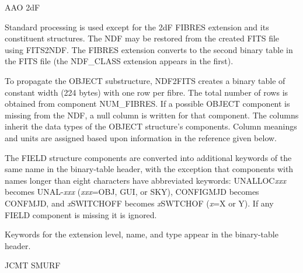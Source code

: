 \documentclass[twoside,11pt]{article}
\newcommand{\htmladdnormallink}[2]{#1}
\newcommand{\sstitem}{\item}
\newcommand{\sstitem}{\item}
\begin{document}
{{{         \sstitem
         AAO \htmladdnormallink{2dF}{http://www.aao.gov.au/local/www/2df/}

         Standard processing is used except for the 2dF FIBRES extension
         and its constituent structures.  The NDF may be restored from the
         created FITS file using FITS2NDF.  The FIBRES extension converts
         to the second binary table in the FITS file (the NDF\_CLASS
         extension appears in the first).

         To propagate the OBJECT substructure, NDF2FITS creates a binary
         table of constant width (224 bytes) with one row per fibre.  The
         total number of rows is obtained from component NUM\_FIBRES.  If a
         possible OBJECT component is missing from the NDF, a null column
         is written for that component.  The columns inherit the data
         types of the OBJECT structure's components.  Column meanings and
         units are assigned based upon information in the reference given
         below.

         The FIELD structure components are converted into additional
         keywords of the same name in the binary-table header, with the
         exception that components with names longer than eight characters
         have abbreviated keywords: UNALLOC\textit{xxx} becomes
         UNAL-\textit{xxx} (\textit{xxx}=OBJ,
         GUI, or SKY), CONFIGMJD becomes CONFMJD, and \textit{x}SWITCHOFF
         becomes \textit{x}SWTCHOF (\textit{x}=X or Y).  If any FIELD 
         component is missing it is ignored.

         Keywords for the extension level, name, and type appear in the
         binary-table header.

         \sstitem
         JCMT SMURF

}}}
\end{document}
